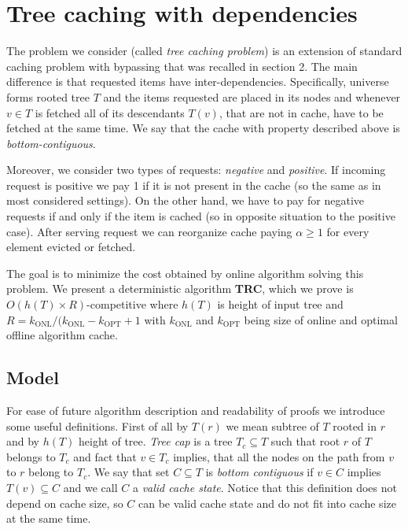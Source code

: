 \section{Tree caching with dependencies}
\label{tree_caching_algo}
The problem we consider (called \textit{tree caching problem}) is an extension 
of standard caching problem with bypassing that was recalled in section 2. The 
main difference is that requested items have inter-dependencies. Specifically, 
universe forms rooted tree $T$ and the items requested are placed in its nodes 
and whenever $v \in T$ is fetched all of its descendants $T(v)$, that are not 
in 
cache, have to be fetched at the same time. We say that the cache with property 
described above is \textit{bottom-contiguous}.

Moreover, we consider two types of requests: \textit{negative} and 
\textit{positive}. If incoming request is positive we pay 1 if it is 
not present in the cache (so the same as in most considered settings). On the 
other hand, we have to pay for negative requests if and only if the item is 
cached (so in opposite 
situation to the positive case). After serving request we can reorganize 
cache paying 
$\alpha \geq 1$ for every element evicted or fetched. 

The goal is to minimize the cost obtained by online algorithm solving this 
problem. We present a deterministic algorithm \textbf{TRC}, which we prove is 
$O(h(T) \times R)$-competitive where $h(T)$ is height of input tree and $R = 
k_{\mathrm{ONL}}/(k_{\mathrm{ONL}} - k_{\mathrm{OPT}} +1$ with 
$k_{\mathrm{ONL}}$ and $k_{\mathrm{OPT}}$ being size of 
online and optimal offline algorithm cache.

\subsection{Model}

For ease of future algorithm description and readability of proofs we introduce 
some useful definitions. First of all by $T(r)$ we mean subtree of $T$ rooted 
in $r$ and by $h(T)$ height of tree. \textit{Tree cap} is a tree $T_c \subseteq 
T$ such that root $r$ of $T$ belongs to $T_c$ and fact that $v \in T_c$ 
implies, that all the 
nodes on the path from $v$ to $r$ belong to $T_c$. We say that set $C \subseteq 
T$ is \textit{bottom contiguous} if $v \in C$ implies $T(v) \subseteq C$ and we 
call $C$ a \textit{valid cache state}. Notice that this definition does not 
depend on 
cache size, so $C$ can be valid cache state and do not fit into cache size 
at the same time.

